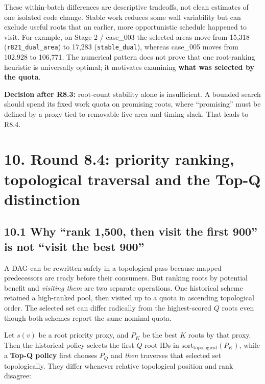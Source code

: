 \documentclass[a4paper,10pt]{article}
\theoremstyle{definition}
\theoremstyle{remark}
\begin{document}
These within-batch differences are descriptive tradeoffs, not clean estimates of one isolated code change. Stable work reduces some wall variability but can exclude useful roots that an earlier, more opportunistic schedule happened to visit. For example, on Stage 2 / case\_003 the selected areas move from 15,318 (\texttt{r821\_dual\_area}) to 17,283 (\texttt{stable\_dual}), whereas case\_005 moves from 102,928 to 106,771. The numerical pattern does not prove that one root-ranking heuristic is universally optimal; it motivates examining \textbf{what was selected by the quota}.

\begin{tcolorbox}[colback=ResearchBlue!6!white,colframe=ResearchSlate!55!white,boxrule=0.65pt,arc=1mm,breakable]
\textbf{Decision after R8.3:} root-count stability alone is insufficient. A bounded search should spend its fixed work quota on promising roots, where ``promising'' must be defined by a proxy tied to removable live area and timing slack. That leads to R8.4.
\end{tcolorbox}

\section{10. Round 8.4: priority ranking, topological traversal and the Top-Q distinction}\label{round-8.4-priority-ranking-topological-traversal-and-the-top-q-distinction}

\subsection{10.1 Why ``rank 1,500, then visit the first 900'' is not ``visit the best 900''}\label{why-rank-1500-then-visit-the-first-900-is-not-visit-the-best-900}

A DAG can be rewritten safely in a topological pass because mapped predecessors are ready before their consumers. But ranking roots by potential benefit and \emph{visiting them} are two separate operations. One historical scheme retained a high-ranked pool, then visited up to a quota in ascending topological order. The selected set can differ radically from the highest-scored \(Q\) roots even though both schemes report the same nominal quota.

Let \(s(v)\) be a root priority proxy, and \(P_K\) be the best \(K\) roots by that proxy. Then the historical policy selects the first \(Q\) root IDs in \(\mathrm{sort}_{\mathrm{topological}}(P_K)\), while a \textbf{Top-Q policy} first chooses \(P_Q\) and \emph{then} traverses that selected set topologically. They differ whenever relative topological position and rank disagree:
\end{document}
